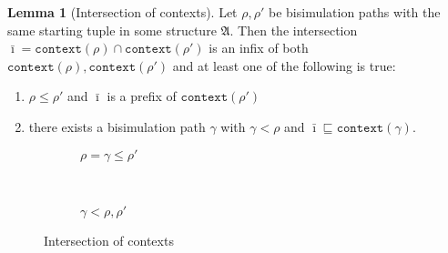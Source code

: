 \documentclass[draft]{scrartcl}
\theoremstyle{definition}
\newtheorem{lemma}[theorem]{Lemma}
\newcommand{\context}[1]{\mathtt{context}(#1)}
\begin{document}
\begin{samepage}
\begin{lemma}[Intersection of contexts]\label{lemma:context-intersection}
  Let $\rho, \rho'$ be bisimulation paths with the same starting tuple in some structure $\mathfrak{A}$.
  Then the intersection $\bar{\imath} = \context{\rho} \cap \context{\rho'}$ is an infix of both $\context{\rho}, \context{\rho'}$ and at least one of the following is true:

  \begin{enumerate}[label=a)]
    \item $\rho \le \rho'$ and $\bar{\imath}$ is a prefix of $\context{\rho'}$
    \item there exists a bisimulation path $\gamma$ with $\gamma < \rho$ and $\bar{\imath} \sqsubseteq \context{\gamma}$.
  \end{enumerate}
\end{lemma}
\end{samepage}

\begin{figure}
  \begin{subfigure}[b]{0.45\textwidth}
    
    \caption{$\rho = \gamma \le \rho'$}
  \end{subfigure}{\unskip\ \vrule\ }
  \begin{subfigure}[b]{0.5\textwidth}
    
    \caption{$\gamma < \rho, \rho'$}
  \end{subfigure}
  \caption{Intersection of contexts}\label{fig:fgf-context-intersect}
\end{figure}
\end{document}
